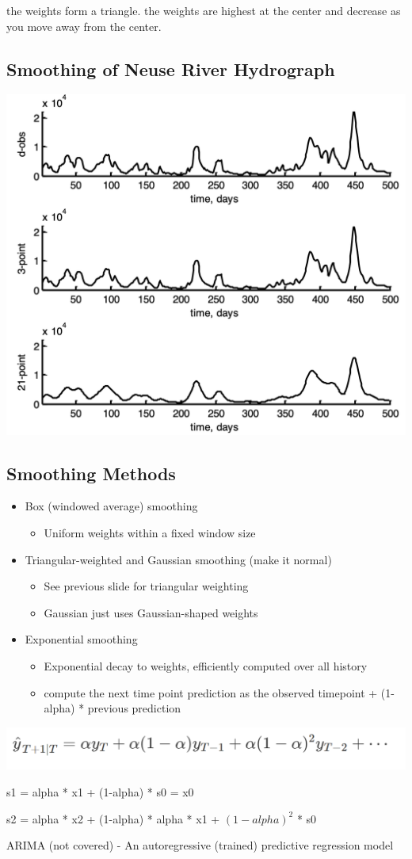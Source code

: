 \documentclass[11pt]{article}
\theoremstyle{definition}
\begin{document}
the weights form a triangle. the weights are highest at the center and decrease as you move away from the center.

\subsection{Smoothing of Neuse River Hydrograph}
\includegraphics[width = \textwidth/2]{18.png}

\subsection{Smoothing Methods}
\begin{itemize}
  \item Box (windowed average) smoothing
  \begin{itemize}
    \item Uniform weights within a fixed window size
  \end{itemize}
  \item Triangular-weighted and Gaussian smoothing (make it normal)
  \begin{itemize}
    \item See previous slide for triangular weighting
    \item Gaussian just uses Gaussian-shaped weights
  \end{itemize} 
  \item Exponential smoothing
  \begin{itemize}
    \item Exponential decay to weights, efficiently computed over all history
    \item compute the next time point prediction as the observed timepoint + (1-alpha) * previous prediction
  \end{itemize}
\end{itemize}
\includegraphics[width = \textwidth/2]{19.png}

s1 = alpha * x1 + (1-alpha) * s0 = x0

s2 = alpha * x2 + (1-alpha) * alpha * x1 + $(1-alpha)^2$ * s0 


ARIMA (not covered) - An autoregressive (trained) predictive regression model
\end{document}
